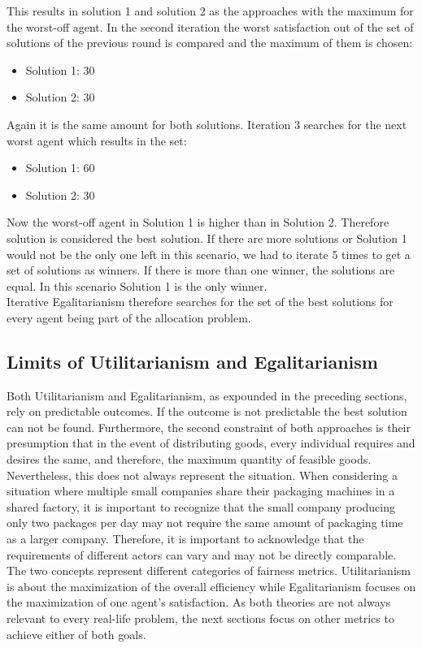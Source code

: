\documentclass[german, a4paper, 11pt, oneside]{scrbook}
\begin{document}
This results in solution 1 and solution 2 as the approaches with the maximum for the worst-off agent. In the second iteration the worst satisfaction out of the set of solutions of the previous round is compared and the maximum of them is chosen:
\begin{itemize}
\item Solution 1: 30 
\item Solution 2: 30 
\end{itemize}
Again it is the same amount for both solutions. Iteration 3 searches for the next worst agent which results in the set:
\begin{itemize}
\item Solution 1: 60 
\item Solution 2: 30 
\end{itemize}
Now the worst-off agent in Solution 1 is higher than in Solution 2. Therefore solution is considered the best solution. If there are more solutions or Solution 1 would not be the only one left in this scenario, we had to iterate 5 times to get a set of solutions as winners. If there is more than one winner, the solutions are equal. In this scenario Solution 1 is the only winner. \\Iterative Egalitarianism therefore searches for the set of the best solutions for every agent being part of the allocation problem.

\subsection{Limits of Utilitarianism and Egalitarianism}
Both Utilitarianism and Egalitarianism, as expounded in the preceding sections, rely on predictable outcomes. If the outcome is not predictable the best solution can not be found. Furthermore, the second constraint of both approaches is their presumption that in the event of distributing goods, every individual requires and desires the same, and therefore, the maximum quantity of feasible goods. \cite{.,XinyingChen.2023,Bhavnani.2022b} Nevertheless, this does not always represent the situation. When considering a situation where multiple small companies share their packaging machines in a shared factory, it is important to recognize that the small company producing only two packages per day may not require the same amount of packaging time as a larger company. Therefore, it is important to acknowledge that the requirements of different actors can vary and may not be directly comparable. \\The two concepts represent different categories of fairness metrics. Utilitarianism is about the maximization of the overall efficiency while Egalitarianism focuses on the maximization of one agent's satisfaction. As both theories are not always relevant to every real-life problem, the next sections focus on other metrics to achieve either of both goals.
\end{document}

